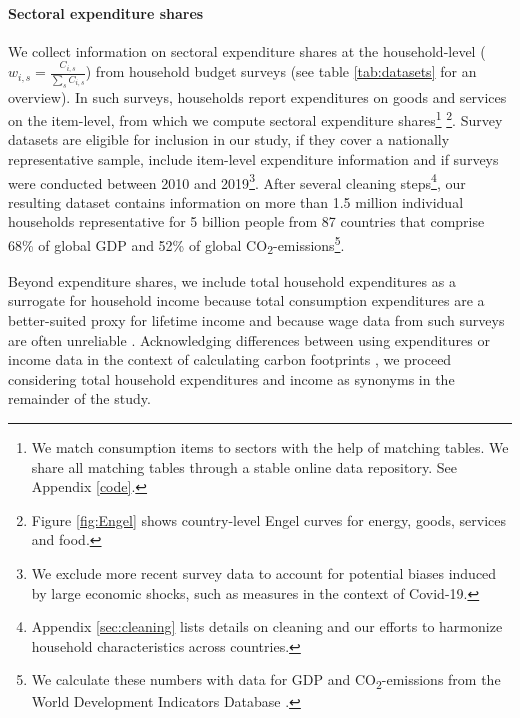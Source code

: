 \documentclass[12pt, a4paper]{article}
\begin{document}
\paragraph{Sectoral expenditure shares} We collect information on sectoral expenditure shares at the household-level ($w_{i,s}=\frac{C_{i,s}}{\sum_{s}C_{i,s}}$) from household budget surveys (see table \ref{tab:datasets} for an overview). In such surveys, households report expenditures on goods and services on the item-level, from which we compute sectoral expenditure shares\footnote{We match consumption items to sectors with the help of matching tables. We share all matching tables through a stable online data repository. See Appendix \ref{code}.} \footnote{Figure \ref{fig:Engel} shows country-level Engel curves for energy, goods, services and food.}. Survey datasets are eligible for inclusion in our study, if they cover a nationally representative sample, include item-level expenditure information and if surveys were conducted between 2010 and 2019\footnote{We exclude more recent survey data to account for potential biases induced by large economic shocks, such as measures in the context of Covid-19.}. After several cleaning steps\footnote{Appendix \ref{sec:cleaning} lists details on cleaning and our efforts to harmonize household characteristics across countries.}, our resulting dataset contains information on more than 1.5 million individual households representative for 5 billion people from 87 countries that comprise 68\% of global GDP and 52\% of global CO\textsubscript{2}-emissions\footnote{We calculate these numbers with data for GDP and CO\textsubscript{2}-emissions from the World Development Indicators Database \autocite{WorldBankGroup.2023}.}.

Beyond expenditure shares, we include total household expenditures as a surrogate for household income because total consumption expenditures are a better-suited proxy for lifetime income \autocite{Poterba.1989,Poterba.1991,Cronin.2019} and because wage data from such surveys are often unreliable \autocite{Blundell.1998}. Acknowledging differences between using expenditures or income data in the context of calculating carbon footprints \autocite{Levay.2023}, we proceed considering total household expenditures and income as synonyms in the remainder of the study.
\end{document}
